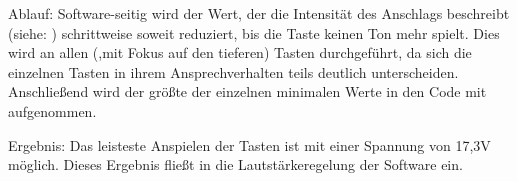 Ablauf: Software-seitig wird der Wert, der die Intensität des Anschlags beschreibt (siehe: ) schrittweise soweit reduziert, bis die Taste keinen Ton mehr spielt.
Dies wird an allen (,mit Fokus auf den tieferen) Tasten durchgeführt, da sich die einzelnen Tasten in ihrem Ansprechverhalten teils deutlich unterscheiden.
Anschließend wird der größte der einzelnen minimalen Werte in den Code mit aufgenommen.

Ergebnis: Das leisteste Anspielen der Tasten ist mit einer Spannung von 17,3V möglich.
Dieses Ergebnis fließt in die Lautstärkeregelung der Software ein.



